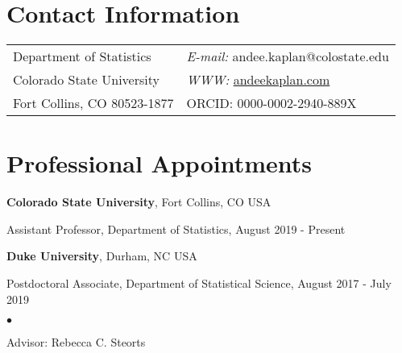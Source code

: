 \documentclass[margin,line]{res}
\newenvironment{list1}{
  \begin{list}{\ding{113}}{%
      \setlength{\itemsep}{0in}
      \setlength{\parsep}{0in} \setlength{\parskip}{0in}
      \setlength{\topsep}{0in} \setlength{\partopsep}{0in}
      \setlength{\leftmargin}{0.17in}}}{\end{list}}
\newenvironment{list2}{
  \begin{list}{$\bullet$}{%
      \setlength{\itemsep}{0in}
      \setlength{\parsep}{0in} \setlength{\parskip}{0in}
      \setlength{\topsep}{0in} \setlength{\partopsep}{0in}
      \setlength{\leftmargin}{0.2in}}}{\end{list}}
\begin{document}
\nocite{*}

\begin{resume}

\section{\sc Contact Information}
\vspace{.05in}
\begin{tabular}{@{}p{2in}p{4in}}
Department of Statistics  & {\it E-mail:} andee.kaplan@colostate.edu\\
Colorado State University &  {\it WWW:} \url{andeekaplan.com} \\
Fort Collins, CO 80523-1877 & ORCID: 0000-0002-2940-889X\\
\end{tabular}

\section{\sc Professional Appointments}
{\bf Colorado State University}, Fort Collins, CO USA\\
\vspace*{-.1in}
\begin{list1}
\item[] Assistant Professor, Department of Statistics, August 2019 - Present
\end{list1}

{\bf Duke University}, Durham, NC USA\\
\vspace*{-.1in}
\begin{list1}
\item[] Postdoctoral Associate, Department of Statistical Science, August 2017 - July 2019
\begin{list2}
\vspace*{.05in}
\item[] Advisor: Rebecca C. Steorts
\end{list2}
\end{list1}


\end{resume}
\end{document}
